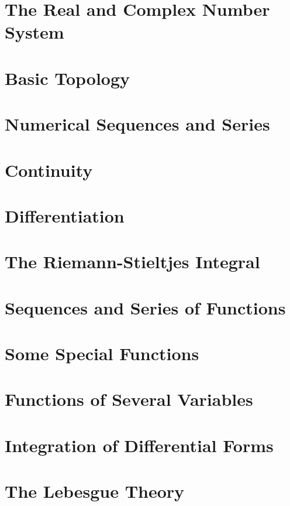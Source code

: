 
\chapter{The Real and Complex Number System}\label{chap:number-systems}


\chapter{Basic Topology}\label{chap:topology}
% 

\chapter{Numerical Sequences and Series}\label{chap:seq-series}
% 

\chapter{Continuity}\label{chap:continuity}
% 

\chapter{Differentiation}\label{chap:differentiation}
% 

\chapter{The Riemann-Stieltjes Integral}\label{chap:integration}
% 

\chapter{Sequences and Series of Functions}\label{chap:seq-series-functions}
% 

\chapter{Some Special Functions}
% 

\chapter{Functions of Several Variables}\label{chap:multivariable}
% 

\chapter{Integration of Differential Forms}\label{chap:forms}
% 

\chapter{The Lebesgue Theory}\label{chap:lebesgue}
% 


